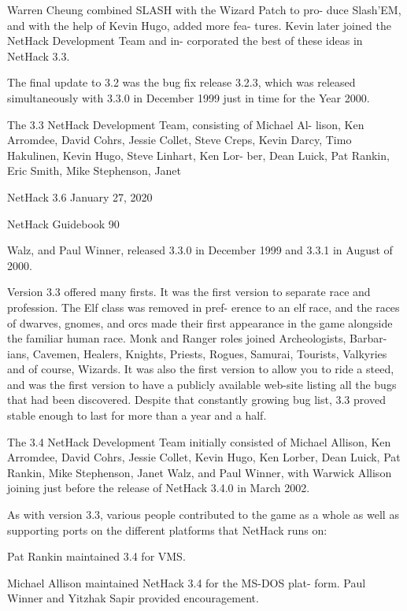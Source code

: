 \documentclass[11pt]{article}
\begin{document}
   Warren Cheung combined SLASH with the Wizard Patch to pro-
duce Slash'EM, and with the help of Kevin Hugo, added more fea-
tures.  Kevin later joined the NetHack Development Team and in-
corporated the best of these ideas in NetHack 3.3.

   The final update to 3.2 was the bug fix release 3.2.3, which
was released simultaneously with 3.3.0 in December 1999 just in
time for the Year 2000.

   The 3.3 NetHack Development Team, consisting of Michael Al-
lison, Ken Arromdee, David Cohrs, Jessie Collet, Steve Creps,
Kevin Darcy, Timo Hakulinen, Kevin Hugo, Steve Linhart, Ken Lor-
ber, Dean Luick, Pat Rankin, Eric Smith, Mike Stephenson, Janet


NetHack 3.6                   January 27, 2020





NetHack Guidebook                       90



Walz, and Paul Winner, released 3.3.0 in December 1999 and 3.3.1
in August of 2000.

   Version 3.3 offered many firsts. It was the first version to
separate race and profession. The Elf class was removed in pref-
erence to an elf race, and the races of dwarves, gnomes, and orcs
made their first appearance in the game alongside the familiar
human race. Monk and Ranger roles joined Archeologists, Barbar-
ians, Cavemen, Healers, Knights, Priests, Rogues,  Samurai,
Tourists, Valkyries and of course, Wizards. It was also the
first version to allow you to ride a steed, and was the first
version to have a publicly available web-site listing all the
bugs that had been discovered. Despite that constantly growing
bug list, 3.3 proved stable enough to last for more than a year
and a half.

   The 3.4 NetHack Development Team initially consisted of
Michael Allison, Ken Arromdee, David Cohrs, Jessie Collet, Kevin
Hugo, Ken Lorber, Dean Luick, Pat Rankin, Mike Stephenson, Janet
Walz, and Paul Winner, with Warwick Allison joining just before
the release of NetHack 3.4.0 in March 2002.

   As with version 3.3, various people contributed to the game
as a whole as well as supporting ports on the different platforms
that NetHack runs on:

Pat Rankin maintained 3.4 for VMS.

   Michael Allison maintained NetHack 3.4 for the MS-DOS plat-
form. Paul Winner and Yitzhak Sapir provided encouragement.
\end{document}
